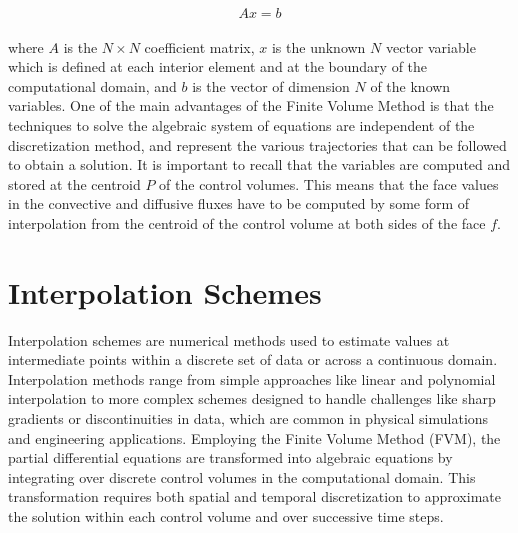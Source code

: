 \documentclass[a5paper]{sapthesis}
\begin{document}
	\begin{equation}
		A x = b
		\label{matrix form}
	\end{equation}
	\\
	where $A$ is the $N \times N$ coefficient matrix, $x$ is the unknown $N$ vector variable which is defined at each interior element and at the boundary of the computational domain, and $b$ is the vector of dimension $N$ of the known variables. One of the main advantages of the Finite Volume Method is that the techniques to solve the algebraic system of equations are independent of the discretization method, and represent the various trajectories that can be followed to obtain a solution. 
	It is important to recall that the variables are computed and stored at the centroid $P$ of the control volumes. This means that the face values in the convective and diffusive fluxes have to be computed by some form of interpolation from the centroid of the control volume at both sides of the face $f$.
	
	\section{Interpolation Schemes}
	
	Interpolation schemes are numerical methods used to estimate values at intermediate points within a discrete set of data or across a continuous domain. Interpolation methods range from simple approaches like linear and polynomial interpolation to more complex schemes designed to handle challenges like sharp gradients or discontinuities in data, which are common in physical simulations and engineering applications. Employing the Finite Volume Method (FVM), the partial differential equations are transformed into algebraic equations by integrating over discrete control volumes in the computational domain. This transformation requires both spatial and temporal discretization to approximate the solution within each control volume and over successive time steps.
	
\end{document}
